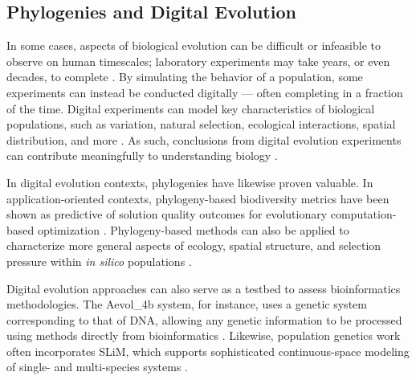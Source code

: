 

\subsection{Phylogenies and Digital Evolution} \label{sec:introduction:digital}

In some cases, aspects of biological evolution can be difficult or infeasible to observe on human timescales; laboratory experiments may take years, or even decades, to complete \citep{wiser2013long,Stroud2025}.
By simulating the behavior of a population, some experiments can instead be conducted digitally --- often completing in a fraction of the time.
Digital experiments can model key characteristics of biological populations, such as variation, natural selection, ecological interactions, spatial distribution, and more \citep{dolson2021digital,haller2023slim}.
As such, conclusions from digital evolution experiments can contribute meaningfully to understanding biology \citep{pennock2007models}.

In digital evolution contexts, phylogenies have likewise proven valuable.
In application-oriented contexts, phylogeny-based biodiversity metrics have been shown as predictive of solution quality outcomes for evolutionary computation-based optimization \citep{hernandez2022phylogenetic}.
Phylogeny-based methods can also be applied to characterize more general aspects of ecology, spatial structure, and selection pressure within \textit{in silico} populations \citep{moreno2023toward}.

Digital evolution approaches can also serve as a testbed to assess bioinformatics methodologies.
The Aevol\_4b system, for instance, uses a genetic system corresponding to that of DNA, allowing any genetic information to be processed using methods directly from bioinformatics \citep{daudey2024aevol}.
Likewise, population genetics work often incorporates SLiM, which supports sophisticated continuous-space modeling of single- and multi-species systems \citep{haller2023slim}.

